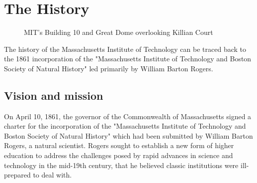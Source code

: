 \section{The History}


\begin{figure}[h]
\caption{MIT's Building 10 and Great Dome overlooking Killian Court}
\end{figure}

The history of the Massachusetts Institute of Technology can be traced back to the 1861 incorporation of the "Massachusetts Institute of Technology and Boston Society of Natural History" led primarily by William Barton Rogers.

\subsection{Vision and mission}

On April 10, 1861, the governor of the Commonwealth of Massachusetts signed a charter for the incorporation of the "Massachusetts Institute of Technology and Boston Society of Natural History" which had been submitted by William Barton Rogers, a natural scientist. Rogers sought to establish a new form of higher education to address the challenges posed by rapid advances in science and technology in the mid-19th century, that he believed classic institutions were ill-prepared to deal with.

